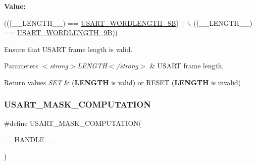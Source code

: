 {\bfseries Value\+:}
\begin{DoxyCode}
(((\_\_LENGTH\_\_) == \hyperlink{group___u_s_a_r_t_ex___word___length_gae2978458689a31bed9a8a3e66ed84f50}{USART\_WORDLENGTH\_8B}) || \(\backslash\)
                                          ((\_\_LENGTH\_\_) == \hyperlink{group___u_s_a_r_t_ex___word___length_ga3a8363f7dccf85ccb52d698e0900f347}{USART\_WORDLENGTH\_9B}))
\end{DoxyCode}


Ensure that U\+S\+A\+RT frame length is valid. 


\begin{DoxyParams}{Parameters}
{\em $<$strong$>$\+L\+E\+N\+G\+T\+H$<$/strong$>$} & U\+S\+A\+RT frame length. \\
\hline
\end{DoxyParams}

\begin{DoxyRetVals}{Return values}
{\em S\+ET} & ({\bfseries L\+E\+N\+G\+TH} is valid) or R\+E\+S\+ET ({\bfseries L\+E\+N\+G\+TH} is invalid) \\
\hline
\end{DoxyRetVals}
\mbox{\label{group___u_s_a_r_t_ex___private___macros_gad57ccc8ecd4497f3d5d7f8da10e00158}} 
\subsubsection{\texorpdfstring{U\+S\+A\+R\+T\+\_\+\+M\+A\+S\+K\+\_\+\+C\+O\+M\+P\+U\+T\+A\+T\+I\+ON}{USART\_MASK\_COMPUTATION}}
{\footnotesize\ttfamily \#define U\+S\+A\+R\+T\+\_\+\+M\+A\+S\+K\+\_\+\+C\+O\+M\+P\+U\+T\+A\+T\+I\+ON(\begin{DoxyParamCaption}\item[{}]{\+\_\+\+\_\+\+H\+A\+N\+D\+L\+E\+\_\+\+\_\+ }\end{DoxyParamCaption})}

